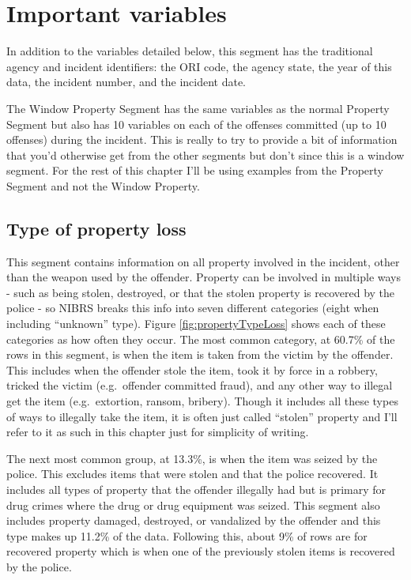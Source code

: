 \documentclass[
  12pt,
  openany]{book}
\begin{document}
\hypertarget{important-variables-5}{%
\section{Important variables}\label{important-variables-5}}

In addition to the variables detailed below, this segment has the traditional agency and incident identifiers: the ORI code, the agency state, the year of this data, the incident number, and the incident date.

The Window Property Segment has the same variables as the normal Property Segment but also has 10 variables on each of the offenses committed (up to 10 offenses) during the incident. This is really to try to provide a bit of information that you'd otherwise get from the other segments but don't since this is a window segment. For the rest of this chapter I'll be using examples from the Property Segment and not the Window Property.

\hypertarget{propertyLoss}{%
\subsection{Type of property loss}\label{propertyLoss}}

This segment contains information on all property involved in the incident, other than the weapon used by the offender. Property can be involved in multiple ways - such as being stolen, destroyed, or that the stolen property is recovered by the police - so NIBRS breaks this info into seven different categories (eight when including ``unknown'' type). Figure \ref{fig:propertyTypeLoss} shows each of these categories as how often they occur. The most common category, at 60.7\% of the rows in this segment, is when the item is taken from the victim by the offender. This includes when the offender stole the item, took it by force in a robbery, tricked the victim (e.g.~offender committed fraud), and any other way to illegal get the item (e.g.~extortion, ransom, bribery). Though it includes all these types of ways to illegally take the item, it is often just called ``stolen'' property and I'll refer to it as such in this chapter just for simplicity of writing.

The next most common group, at 13.3\%, is when the item was seized by the police. This excludes items that were stolen and that the police recovered. It includes all types of property that the offender illegally had but is primary for drug crimes where the drug or drug equipment was seized. This segment also includes property damaged, destroyed, or vandalized by the offender and this type makes up 11.2\% of the data. Following this, about 9\% of rows are for recovered property which is when one of the previously stolen items is recovered by the police.
\end{document}

